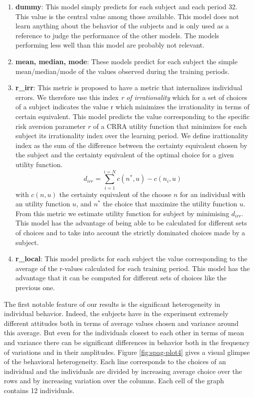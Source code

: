 \documentclass[
]{book}
\providecommand{\tightlist}{%
  \setlength{\itemsep}{0pt}\setlength{\parskip}{0pt}}
\begin{document}
\begin{enumerate}
\def\labelenumi{\arabic{enumi}.}
\tightlist
\item
  \textbf{dummy}: This model simply predicts for each subject and each
  period 32.
  This value is the central value among those available.
  This model does not learn anything about the behavior of the
  subjects and is only used as a reference to judge the performance of
  the other models.
  The models performing less well than this model are probably not relevant.
\item
  \textbf{mean, median, mode}: These models predict for each subject the simple
  mean/median/mode of the values observed during the training periods.
\item
  \textbf{r\_irr}: This metric is proposed to have a metric that internalizes
  individual errors.
  We therefore use this index \emph{r of irrationality} which for a set of choices of a
  subject indicates the value r which minimizes the irrationality in terms of
  certain equivalent.
  This model predicts the value corresponding to the specific risk
  aversion parameter \(r\) of a CRRA utility function
  that minimizes for each subject its irrationality index over
  the learning period.
  We define irattionality index as the sum of the
  difference between the certainty equivalent chosen by the subject
  and the certainty equivalent of the optimal choice for a given
  utility function.
  \[
  d_{irr} = \sum_{i =1}^{i = N}c(n^*, u)-c(n_i, u) 
  \]
  with \(c(n, u)\) the certainty equivalent of the choose \(n\) for
  an individual with an utility function \(u\), and \(n^*\) the choice that
  maximize the utility function \(u\).
  From this metric we estimate utility function for subject by minimising
  \(d_{irr}\).
  This model has the advantage of being able to be calculated for different sets
  of choices and to take into account the strictly dominated choices made by a subject.
\item
  \textbf{r\_local}: This model predicts for each subject the value
  corresponding to the average of the r-values calculated for each
  training period. This model has the advantage that it can be
  computed for different sets of choices like the previous one.
\end{enumerate}

The first notable feature of our results is the significant heterogeneity in
individual behavior. Indeed, the subjects have in the experiment
extremely different attitudes both in terms of average values chosen and
variance around this average. But even for the individuals closest to each other
in terms of mean and variance there can be significant differences in behavior
both in the frequency of variations and in their amplitudes.
Figure \ref{fig:spag-plot4} gives a visual glimpse of the behavioral
heterogeneity.
Each line corresponds to the choices of an individual and the individuals are
divided by increasing average choice over the rows and by increasing variation
over the columns.
Each cell of the graph contains 12 individuals.
\end{document}
